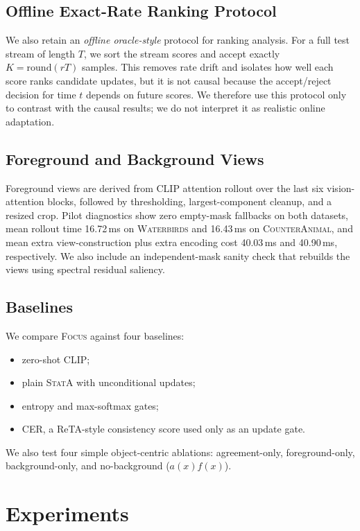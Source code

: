 \documentclass{article}
\newcommand{\focus}{\textsc{Focus}}
\newcommand{\stata}{\textsc{StatA}}
\newcommand{\wb}{\textsc{Waterbirds}}
\newcommand{\ca}{\textsc{CounterAnimal}}
\begin{document}
\subsection{Offline Exact-Rate Ranking Protocol}

We also retain an \emph{offline oracle-style} protocol for ranking analysis. For a full test stream of length $T$, we sort the stream scores and accept exactly $K=\mathrm{round}(rT)$ samples. This removes rate drift and isolates how well each score ranks candidate updates, but it is not causal because the accept/reject decision for time $t$ depends on future scores. We therefore use this protocol only to contrast with the causal results; we do not interpret it as realistic online adaptation.

\subsection{Foreground and Background Views}

Foreground views are derived from CLIP attention rollout over the last six vision-attention blocks, followed by thresholding, largest-component cleanup, and a resized crop. Pilot diagnostics show zero empty-mask fallbacks on both datasets, mean rollout time 16.72\,ms on \wb{} and 16.43\,ms on \ca{}, and mean extra view-construction plus extra encoding cost 40.03\,ms and 40.90\,ms, respectively. We also include an independent-mask sanity check that rebuilds the views using spectral residual saliency.

\subsection{Baselines}

We compare \focus{} against four baselines:
\begin{itemize}
    \item zero-shot CLIP;
    \item plain \stata{} with unconditional updates;
    \item entropy and max-softmax gates;
    \item CER, a ReTA-style consistency score used only as an update gate.
\end{itemize}
We also test four simple object-centric ablations: agreement-only, foreground-only, background-only, and no-background ($a(x)f(x)$).

\section{Experiments}
\label{sec:experiments}
\end{document}
